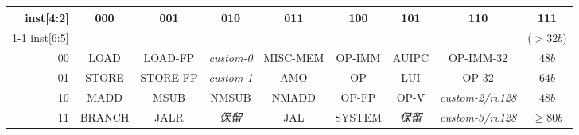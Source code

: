 \vspace{0.1in}
\begin{table*}[htbp]
\begin{center}
{\footnotesize
\setlength{\tabcolsep}{4pt}
\begin{tabular}{|r|c|c|c|c|c|c|c|c|}
  \hline
  inst[4:2] & 000    & 001      & 010            & 011      & 100    & 101            & 110                  & \cellcolor{gray}111 \\ \cline{1-1}
  inst[6:5] &        &          &                &          &        &                &                      & \cellcolor{gray}($>32b$)  \\ \hline
         00 & LOAD   & LOAD-FP  & {\em custom-0} & MISC-MEM & OP-IMM & AUIPC          & OP-IMM-32            & \cellcolor{gray} $48b$\\ \hline
         01 & STORE  & STORE-FP & {\em custom-1} & AMO      & OP     & LUI            & OP-32                & \cellcolor{gray} $64b$ \\ \hline
         10 & MADD   & MSUB     & NMSUB          & NMADD    & OP-FP  & OP-V           & {\em custom-2/rv128} & \cellcolor{gray} $48b$\\ \hline
         11 & BRANCH & JALR     & {\em 保留} & JAL      & SYSTEM & {\em 保留} & {\em custom-3/rv128} & \cellcolor{gray} $\geq80b$\\ \hline

 \end{tabular}
}
\end{center}
\vspace{-0.15in}
\caption{RISCV-V基础操作码映射，instinst[1:0]=11
}
\label{opcodemap}
\end{table*}

